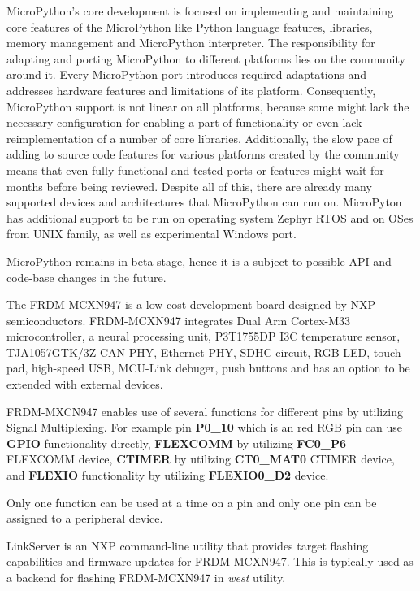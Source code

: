 \documentclass[twoside, 12pt]{article}
\begin{document}
MicroPython's core development is focused on implementing and maintaining core features
of the MicroPython like Python language features, libraries, memory management and 
MicroPython interpreter. The responsibility for adapting and porting MicroPython to different
platforms lies on the community around it. Every MicroPython port introduces required 
adaptations and addresses hardware features and limitations of its platform. Consequently,
MicroPython support is not linear on all platforms, because some might lack the necessary
configuration for enabling a part of functionality or even lack reimplementation of a number of core libraries. Additionally, the slow pace of adding to source code features for various platforms 
created by the community means that
even fully functional and tested ports or features might wait for months before being reviewed.
Despite all of this, there are already many supported devices and architectures that 
MicroPython can run on. MicroPyton has additional support to be run on
operating system Zephyr RTOS and on OSes from UNIX family, as well as experimental Windows 
port.

MicroPython remains in beta-stage, hence it is a subject to possible API and code-base changes in the future.\cite{mpy_book}

The FRDM-MCXN947 is a low-cost development board designed by NXP semiconductors. FRDM-MCXN947 
integrates Dual Arm
Cortex-M33 microcontroller, a neural processing unit, P3T1755DP I3C temperature sensor, 
TJA1057GTK/3Z CAN PHY, Ethernet PHY, SDHC circuit, RGB LED, touch pad, high-speed USB, MCU-Link debuger,
push buttons and has an option to be extended with external devices.
\cite{mcxn947_manual}

\obrazek
{}

FRDM-MXCN947 enables use of several functions for different pins by utilizing Signal 
Multiplexing. For example pin \textbf{P0\_10} which is an red RGB pin can use \textbf{GPIO} 
functionality directly, \textbf{FLEXCOMM} by utilizing \textbf{FC0\_P6} FLEXCOMM device,
\textbf{CTIMER} by utilizing \textbf{CT0\_MAT0} CTIMER device, and \textbf{FLEXIO} 
functionality by utilizing \textbf{FLEXIO0\_D2} device.

Only one function can be used at a time on a pin and only one pin can be assigned to a 
peripheral device. \cite{mcx_manual} 

LinkServer is an NXP command-line utility that provides  target flashing capabilities and 
firmware updates for FRDM-MCXN947. This is typically used as a backend for flashing FRDM-MCXN947 in \textit{west} utility. \cite{link_server}
\end{document}
